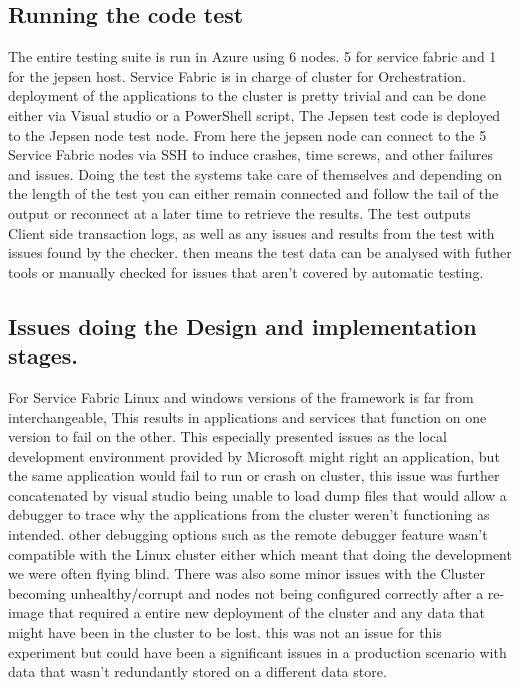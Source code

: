 \documentclass[a4paper,10pt,titlepage]{report}
\begin{document}
\subsection{Running the code test}

    The entire testing suite is run in Azure using 6 nodes. 5 for service fabric and 1 for the jepsen host. Service Fabric is in charge of cluster for Orchestration. deployment of the applications to the cluster is pretty trivial and can be done either via Visual studio or a PowerShell script, The Jepsen test code is deployed to the Jepsen node test node. From here the jepsen node can connect to the 5 Service Fabric nodes via SSH to induce crashes, time screws, and other failures and issues.  Doing the test the systems take care of themselves and depending on the length of the test you can either remain connected and follow the tail of the output or reconnect at a later time to retrieve the results. The test outputs Client side transaction logs, as well as any issues and results from the test with issues found by the checker. then means the test data can be analysed with futher tools or manually checked for issues that aren't covered by automatic testing.
    
    
    \subsection{Issues doing the Design and implementation stages.}
    
    For Service Fabric Linux and windows versions of the framework is far from interchangeable, This results in applications and services that function on one version to fail on the other. This especially presented issues as the local development environment provided by Microsoft might right an application, but the same application would fail to run or crash on cluster, this issue was further concatenated by visual studio being unable to load dump files that would allow a debugger to trace why the applications from the cluster weren't functioning as intended. other debugging options such as the remote debugger feature wasn't compatible with the Linux cluster either which meant that doing the development we were often flying blind. There was also some minor issues with the Cluster becoming unhealthy/corrupt and nodes not being configured correctly after a re-image that required a entire new deployment of the cluster and any data that might have been in the cluster to be lost. this was not an issue for this experiment but could have been a significant issues in a production scenario with data that wasn't redundantly stored on a different data store.
    
\end{document}
